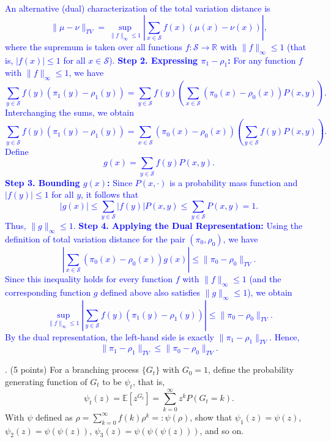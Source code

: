\documentclass{article}
\begin{document}
\textcolor{blue}{
    An alternative (dual) characterization of the total variation distance is
\[
\|\mu-\nu\|_{TV} = \sup_{\|f\|_\infty \le 1} \left| \sum_{x\in \mathcal{S}} f(x)(\mu(x)-\nu(x)) \right|,
\]
where the supremum is taken over all functions \(f:\mathcal{S}\to\mathbb{R}\) with \(\|f\|_\infty \le 1\) (that is, \(|f(x)| \le 1\) for all \(x\in \mathcal{S}\)).
\medskip
\noindent \textbf{Step 2. Expressing \(\pi_1-\rho_1\):} 
For any function \(f\) with \(\|f\|_\infty \le 1\), we have
\[
\sum_{y\in\mathcal{S}} f(y)\left(\pi_1(y)-\rho_1(y)\right) 
=\sum_{y\in\mathcal{S}} f(y) \left( \sum_{x\in\mathcal{S}} (\pi_0(x)-\rho_0(x)) P(x,y) \right).
\]
Interchanging the sums, we obtain
\[
\sum_{y\in\mathcal{S}} f(y)\left(\pi_1(y)-\rho_1(y)\right) 
=\sum_{x\in\mathcal{S}} (\pi_0(x)-\rho_0(x)) \left( \sum_{y\in\mathcal{S}} f(y)P(x,y) \right).
\]
Define
\[
g(x) = \sum_{y\in\mathcal{S}} f(y)P(x,y).
\]
\medskip
\noindent \textbf{Step 3. Bounding \(g(x)\):}
Since \(P(x,\cdot)\) is a probability mass function and \(|f(y)| \le 1\) for all \(y\), it follows that
\[
|g(x)| \le \sum_{y\in\mathcal{S}} |f(y)| P(x,y) \le \sum_{y\in\mathcal{S}} P(x,y) = 1.
\]
Thus, \(\|g\|_\infty \le 1\).
\medskip
\noindent \textbf{Step 4. Applying the Dual Representation:}
Using the definition of total variation distance for the pair \((\pi_0, \rho_0)\), we have
\[
\left|\sum_{x\in\mathcal{S}} (\pi_0(x)-\rho_0(x))g(x)\right| \le \|\pi_0-\rho_0\|_{TV}.
\]
Since this inequality holds for every function \(f\) with \(\|f\|_\infty \le 1\) (and the corresponding function \(g\) defined above also satisfies \(\|g\|_\infty \le 1\)), we obtain
\[
\sup_{\|f\|_\infty \le 1} \left|\sum_{y\in\mathcal{S}} f(y)\left(\pi_1(y)-\rho_1(y)\right)\right| \le \|\pi_0-\rho_0\|_{TV}.
\]
By the dual representation, the left-hand side is exactly \(\|\pi_1-\rho_1\|_{TV}\). Hence,
\[
\|\pi_1-\rho_1\|_{TV} \le \|\pi_0-\rho_0\|_{TV}.
\]
}

. (5 points) For a branching process $\{G_t\}$ with $G_0 = 1$, define the probability generating function of $G_t$ to be $\psi_t$, that is,
\[
\psi_t(z) = \mathbb{E}[z^{G_t}] = \sum_{k=0}^{\infty} z^k P(G_t = k).
\]
With $\psi$ defined as $\rho = \sum_{k=0}^{\infty}f(k)\rho^k =: \psi(\rho)$, show that $\psi_1(z) = \psi(z)$, $\psi_2(z) = \psi(\psi(z))$, $\psi_3(z) = \psi(\psi(\psi(z)))$, and so on.
\end{document}
